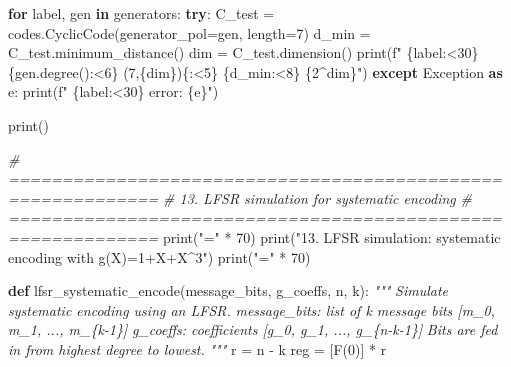 \documentclass[
]{article}
\newenvironment{Shaded}{}{}
\newcommand{\BuiltInTok}[1]{\textcolor[rgb]{0.00,0.50,0.00}{#1}}
\newcommand{\CommentTok}[1]{\textcolor[rgb]{0.38,0.63,0.69}{\textit{#1}}}
\newcommand{\ControlFlowTok}[1]{\textcolor[rgb]{0.00,0.44,0.13}{\textbf{#1}}}
\newcommand{\DecValTok}[1]{\textcolor[rgb]{0.25,0.63,0.44}{#1}}
\newcommand{\ImportTok}[1]{\textcolor[rgb]{0.00,0.50,0.00}{\textbf{#1}}}
\newcommand{\KeywordTok}[1]{\textcolor[rgb]{0.00,0.44,0.13}{\textbf{#1}}}
\newcommand{\NormalTok}[1]{#1}
\newcommand{\OperatorTok}[1]{\textcolor[rgb]{0.40,0.40,0.40}{#1}}
\newcommand{\PreprocessorTok}[1]{\textcolor[rgb]{0.74,0.48,0.00}{#1}}
\newcommand{\SpecialCharTok}[1]{\textcolor[rgb]{0.25,0.44,0.63}{#1}}
\newcommand{\SpecialStringTok}[1]{\textcolor[rgb]{0.73,0.40,0.53}{#1}}
\newcommand{\StringTok}[1]{\textcolor[rgb]{0.25,0.44,0.63}{#1}}
\begin{document}
\begin{Shaded}
\begin{Highlighting}[]
\ControlFlowTok{for}\NormalTok{ label, gen }\KeywordTok{in}\NormalTok{ generators:}
    \ControlFlowTok{try}\NormalTok{:}
\NormalTok{        C\_test }\OperatorTok{=}\NormalTok{ codes.CyclicCode(generator\_pol}\OperatorTok{=}\NormalTok{gen, length}\OperatorTok{=}\DecValTok{7}\NormalTok{)}
\NormalTok{        d\_min }\OperatorTok{=}\NormalTok{ C\_test.minimum\_distance()}
\NormalTok{        dim }\OperatorTok{=}\NormalTok{ C\_test.dimension()}
        \BuiltInTok{print}\NormalTok{(}\SpecialStringTok{f"  }\SpecialCharTok{\{}\NormalTok{label}\SpecialCharTok{:\textless{}30\}}\SpecialStringTok{ }\SpecialCharTok{\{}\NormalTok{gen}\SpecialCharTok{.}\NormalTok{degree()}\SpecialCharTok{:\textless{}6\}}\SpecialStringTok{ (7,}\SpecialCharTok{\{}\NormalTok{dim}\SpecialCharTok{\}}\SpecialStringTok{)}\SpecialCharTok{\{}\StringTok{\textquotesingle{}\textquotesingle{}}\SpecialCharTok{:\textless{}5\}}\SpecialStringTok{ }\SpecialCharTok{\{}\NormalTok{d\_min}\SpecialCharTok{:\textless{}8\}}\SpecialStringTok{ }\SpecialCharTok{\{}\DecValTok{2}\OperatorTok{\^{}}\NormalTok{dim}\SpecialCharTok{\}}\SpecialStringTok{"}\NormalTok{)}
    \ControlFlowTok{except} \PreprocessorTok{Exception} \ImportTok{as}\NormalTok{ e:}
        \BuiltInTok{print}\NormalTok{(}\SpecialStringTok{f"  }\SpecialCharTok{\{}\NormalTok{label}\SpecialCharTok{:\textless{}30\}}\SpecialStringTok{ error: }\SpecialCharTok{\{}\NormalTok{e}\SpecialCharTok{\}}\SpecialStringTok{"}\NormalTok{)}

\BuiltInTok{print}\NormalTok{()}

\CommentTok{\# ============================================================}
\CommentTok{\# 13. LFSR simulation for systematic encoding}
\CommentTok{\# ============================================================}
\BuiltInTok{print}\NormalTok{(}\StringTok{"="} \OperatorTok{*} \DecValTok{70}\NormalTok{)}
\BuiltInTok{print}\NormalTok{(}\StringTok{"13. LFSR simulation: systematic encoding with g(X)=1+X+X\^{}3"}\NormalTok{)}
\BuiltInTok{print}\NormalTok{(}\StringTok{"="} \OperatorTok{*} \DecValTok{70}\NormalTok{)}

\KeywordTok{def}\NormalTok{ lfsr\_systematic\_encode(message\_bits, g\_coeffs, n, k):}
    \CommentTok{"""}
\CommentTok{    Simulate systematic encoding using an LFSR.}
\CommentTok{    message\_bits: list of k message bits [m\_0, m\_1, ..., m\_\{k{-}1\}]}
\CommentTok{    g\_coeffs: coefficients [g\_0, g\_1, ..., g\_\{n{-}k{-}1\}]}
\CommentTok{    Bits are fed in from highest degree to lowest.}
\CommentTok{    """}
\NormalTok{    r }\OperatorTok{=}\NormalTok{ n }\OperatorTok{{-}}\NormalTok{ k}
\NormalTok{    reg }\OperatorTok{=}\NormalTok{ [F(}\DecValTok{0}\NormalTok{)] }\OperatorTok{*}\NormalTok{ r}


\end{Highlighting}
\end{Shaded}
\end{document}
